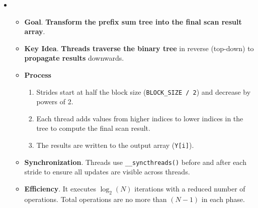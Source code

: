 \begin{itemize}
    \item {}
    \begin{itemize}
        \item[\textcolor{Green3}{\faIcon{book}}] \textcolor{Green3}{\textbf{Goal}}. \textbf{Transform the prefix sum tree into the final scan result array}.

        \item[\textcolor{Green3}{\faIcon{lightbulb}}] \textcolor{Green3}{\textbf{Key Idea}}. \textbf{Threads traverse the binary tree} in reverse (top-down) to \textbf{propagate results} downwards.

        \item[\textcolor{Green3}{\faIcon{tools}}] \textcolor{Green3}{\textbf{Process}}
        \begin{enumerate}
            \item Strides start at half the block size (\texttt{BLOCK\_SIZE / 2}) and decrease by powers of 2.
            \item Each thread adds values from higher indices to lower indices in the tree to compute the final scan result.
            \item The results are written to the output array (\texttt{Y[i]}).
        \end{enumerate}

        \item[\textcolor{Green3}{\faIcon{clock}}] \textcolor{Green3}{\textbf{Synchronization}}. Threads use \texttt{\_\_syncthreads()} before and after each stride to ensure all updates are visible across threads.

        \item[\textcolor{Green3}{\faIcon{check-circle}}] \textcolor{Green3}{\textbf{Efficiency}}. It executes $\log_{2}\left(N\right)$ iterations with a reduced number of operations. Total operations are no more than $\left(N-1\right)$ in each phase.
    \end{itemize}
\end{itemize}

\newpage

